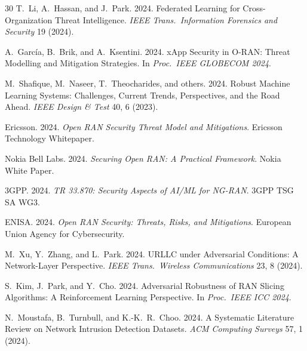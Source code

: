\documentclass[sigconf,nonacm]{acmart}
\begin{document}
\begin{thebibliography}{30}
T.~Li, A.~Hassan, and J.~Park. 2024. Federated Learning for
Cross-Organization Threat Intelligence. \textit{IEEE Trans.\
Information Forensics and Security} 19 (2024).

A.~Garc\'ia, B.~Brik, and A.~Ksentini. 2024. xApp Security in
O-RAN: Threat Modelling and Mitigation Strategies.
In \textit{Proc.\ IEEE GLOBECOM 2024}.

M.~Shafique, M.~Naseer, T.~Theocharides, and others. 2024.
Robust Machine Learning Systems: Challenges, Current Trends,
Perspectives, and the Road Ahead. \textit{IEEE Design \& Test}
40, 6 (2023).

Ericsson. 2024. \textit{Open RAN Security Threat Model and
Mitigations}. Ericsson Technology Whitepaper.

Nokia Bell Labs. 2024. \textit{Securing Open RAN: A Practical
Framework}. Nokia White Paper.

3GPP. 2024. \textit{TR 33.870: Security Aspects of AI/ML for
NG-RAN}. 3GPP TSG SA WG3.

ENISA. 2024. \textit{Open RAN Security: Threats, Risks, and
Mitigations}. European Union Agency for Cybersecurity.

M.~Xu, Y.~Zhang, and L.~Park. 2024. URLLC under Adversarial
Conditions: A Network-Layer Perspective.
\textit{IEEE Trans.\ Wireless Communications} 23, 8 (2024).

S.~Kim, J.~Park, and Y.~Cho. 2024. Adversarial Robustness of
RAN Slicing Algorithms: A Reinforcement Learning Perspective.
In \textit{Proc.\ IEEE ICC 2024}.

N.~Moustafa, B.~Turnbull, and K.-K.~R.~Choo. 2024. A Systematic
Literature Review on Network Intrusion Detection Datasets.
\textit{ACM Computing Surveys} 57, 1 (2024).

\end{thebibliography}
\end{document}
